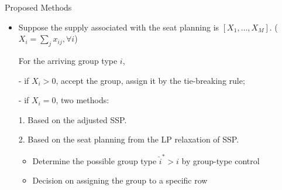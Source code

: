   \begin{frame}{Proposed Methods}

    \begin{itemize}
      \item Suppose the supply associated with the seat planning is $[X_{1}, \ldots, X_M]$. ($X_{i} = \sum_{j} x_{ij}, \forall i$)
      
      \vspace{0.5cm}

      For the arriving group type $i$,

      \item[-] if $X_i > 0$, accept the group, assign it by the tie-breaking rule;
      
      \item[-] if $X_i = 0$, two methods:
      
      \vspace{0.5cm}

      1. Based on the adjusted SSP.
      \vspace{0.5cm}

      2. Based on the seat planning from the LP relaxation of SSP.
      \begin{itemize}
        \item Determine the possible group type $\hat{i}^{*}>i$ by group-type control
        \item Decision on assigning the group to a specific row
      \end{itemize}
    \end{itemize}
  \end{frame}

